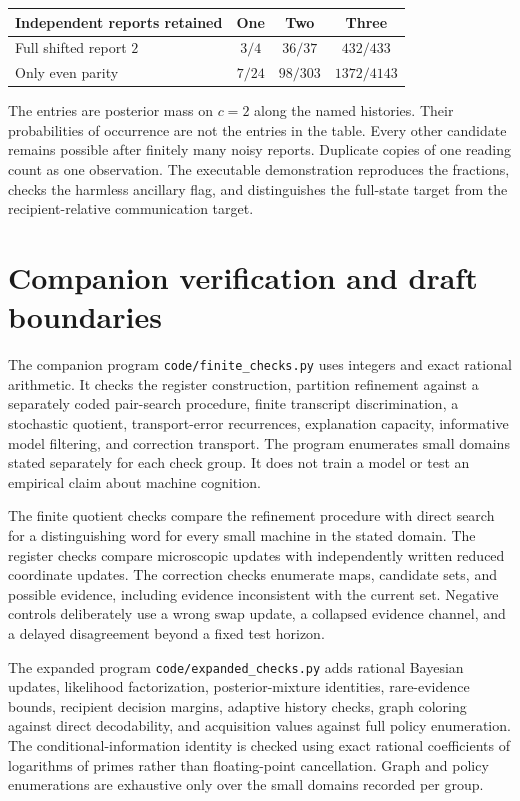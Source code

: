 \documentclass[11pt,letterpaper]{article}
\theoremstyle{plain}
\theoremstyle{definition}
\newcommand{\code}[1]{\texttt{\small #1}}
\begin{document}
\begin{center}
\begin{tabular}{@{}lccc@{}}\toprule
Independent reports retained & One & Two & Three\\\midrule
Full shifted report $2$ & $3/4$ & $36/37$ & $432/433$\\
Only even parity & $7/24$ & $98/303$ & $1372/4143$\\\bottomrule
\end{tabular}
\end{center}
The entries are posterior mass on $c=2$ along the named histories. Their probabilities of occurrence are not the entries in the table. Every other candidate remains possible after finitely many noisy reports. Duplicate copies of one reading count as one observation. The executable demonstration reproduces the fractions, checks the harmless ancillary flag, and distinguishes the full-state target from the recipient-relative communication target.

\section{Companion verification and draft boundaries}\label{app:verification}
The companion program \code{code/finite\_checks.py} uses integers and exact rational arithmetic. It checks the register construction, partition refinement against a separately coded pair-search procedure, finite transcript discrimination, a stochastic quotient, transport-error recurrences, explanation capacity, informative model filtering, and correction transport. The program enumerates small domains stated separately for each check group. It does not train a model or test an empirical claim about machine cognition.

The finite quotient checks compare the refinement procedure with direct search for a distinguishing word for every small machine in the stated domain. The register checks compare microscopic updates with independently written reduced coordinate updates. The correction checks enumerate maps, candidate sets, and possible evidence, including evidence inconsistent with the current set. Negative controls deliberately use a wrong swap update, a collapsed evidence channel, and a delayed disagreement beyond a fixed test horizon.

The expanded program \code{code/expanded\_checks.py} adds rational Bayesian updates, likelihood factorization, posterior-mixture identities, rare-evidence bounds, recipient decision margins, adaptive history checks, graph coloring against direct decodability, and acquisition values against full policy enumeration. The conditional-information identity is checked using exact rational coefficients of logarithms of primes rather than floating-point cancellation. Graph and policy enumerations are exhaustive only over the small domains recorded per group.
\end{document}

